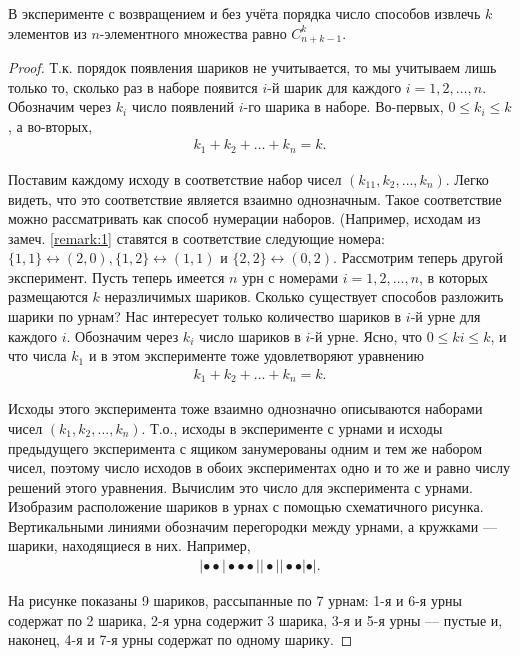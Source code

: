 \begin{theorem}
В эксперименте с возвращением и без учёта порядка число
способов извлечь $k$ элементов из $n$-элементного множества равно $C^k_{n+k-1}$.
\end{theorem}
\begin{proof}
Т.к. порядок появления шариков не учитывается, то мы
учитываем лишь только то, сколько раз в наборе появится $i$-й шарик для
каждого $i = 1, 2,\dots, n$. Обозначим через $k_i$ число появлений $i$-го шарика в
наборе. Во-первых, $0 \leqslant k_i \leqslant k$, а во-вторых,
\begin{gather*}
k_1+k_2+\dots+k_n=k.
\end{gather*}

Поставим каждому исходу в соответствие набор чисел $(k_11, k_2,\dots, k_n)$.
Легко видеть, что это соответствие является взаимно однозначным. Такое соответствие можно рассматривать как способ нумерации наборов. (Например,
исходам из замеч. \ref{remark:1} ставятся в соответствие следующие номера:
$\{1, 1\} \leftrightarrow (2, 0), 
\{1, 2\} \leftrightarrow (1, 1) \text{ и } 
\{2, 2\} \leftrightarrow (0, 2).$
Рассмотрим теперь другой эксперимент. Пусть теперь имеется $n$ урн с
номерами $i = 1, 2,\dots, n$, в которых размещаются $k$ неразличимых шариков.
Сколько существует способов разложить шарики по урнам? Нас интересует
только количество шариков в $i$-й урне для каждого $i$. Обозначим через $k_i$
число шариков в $i$-й урне. Ясно, что $0 \leqslant ki \leqslant k$, и что числа $k_1$ и в этом
эксперименте тоже удовлетворяют уравнению
\begin{gather*}
k_1+k_2+\dots+k_n=k.
\end{gather*}

Исходы этого эксперимента тоже взаимно однозначно описываются наборами
чисел \newline $(k_1, k_2,\dots, k_n)$. Т.о., исходы в эксперименте с урнами и исходы предыдущего эксперимента с ящиком занумерованы одним и тем же набором чисел,
поэтому число исходов в обоих экспериментах одно и то же и равно числу
решений этого уравнения. Вычислим это число для эксперимента с урнами.
Изобразим расположение шариков в урнах с помощью схематичного рисунка. Вертикальными линиями обозначим перегородки между урнами, а
кружками — шарики, находящиеся в них. Например,
\begin{gather*}
\left|\bullet\bullet\right|\bullet\bullet\bullet||\bullet||\bullet\bullet|\bullet|.
\end{gather*}

На рисунке показаны 9 шариков, рассыпанные по 7 урнам: 1-я и 6-я урны
содержат по 2 шарика, 2-я урна содержит 3 шарика, 3-я и 5-я урны — пустые
и, наконец, 4-я и 7-я урны содержат по одному шарику.


\end{proof}
